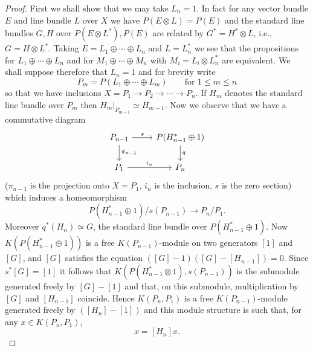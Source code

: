 \documentclass[leqno]{book}
\numberwithin{equation}{section}
\theoremstyle{definition}
\begin{document}
            \begin{proof}
              First we shall show that we may take $L_{n}=1$. In fact for any vector bundle $E$ and line bundle $L$ over $X$ we have $P(E\otimes  L)=P(E)$ and the standard line bundles $G, H$ over $P(E\otimes L^{*}),P(E)$ are related by $G^{*}=H^{*}\otimes L$, i.e., $G=H\otimes L^{*}$. Taking $E=L_1\oplus \cdots\oplus L_{n}$ and $L=L_{n}^{*}$ we see that the propositions for $L_1\oplus \cdots\oplus L_{n}$ and for $M_1\oplus  \cdots\oplus M_{n}$ with $M_{i}=L_{i}\otimes L_{n}^{*}$ are equivalent. We shall suppose therefore that $L_{n}=1$ and for brevity write
              \begin{equation*}
                P_{m}=P(L_1\oplus \cdots\oplus L_{m})\qquad \text{for } 1\le m\le n
              \end{equation*}
              so that we have inclusions $X=P_1\to P_2\to \cdots\to P_{n}$. If $H_{m}$ denotes the standard line bundle over $P_{m}$ then $H_{m}|_{P_{m-1}}\simeq H_{m-1}$. Now we observe that we have a commutative diagram 
              \begin{equation*}
                \begin{tikzcd}
                  P_{n-1}\arrow[r, "s"] \arrow[d, "\pi_{n-1}"] & P(H_{n-1}^{*}\oplus 1)\arrow[d, "q"] \\
                  P_1\arrow[r, "i_{n}"] & P_{n}
                \end{tikzcd}
              \end{equation*}
              ($\pi_{n-1}$ is the projection onto $X=P_1$, $i_{n}$ is the inclusion, $s$ is the zero section) which induces a homeomorphism
              \begin{equation*}
                P(H^{*}_{n-1}\oplus 1)/s(P_{n-1})\to P_{n}/P_1 .
              \end{equation*}
              Moreover $q^{*}(H_{n})\simeq G$, the standard line bundle over $P(H_{n-1}^{*}\oplus 1)$. Now $K(P(H_{n-1}^{*}\oplus 1))$ is a free $K(P_{n-1})$-module on two generators $[1]$ and $[G]$, and $[G]$ satisfies the equation $([G]-1)([G]-[H_{n-1}])=0$. Since $s^{*}[G]=[1]$ it follows that $K(P(H^{*}_{n-1}\otimes 1),s(P_{n-1}))$ is the submodule generated freely by $[G]-[1]$ and that, on this submodule, multiplication by $[G]$ and $[H_{n-1}]$ coincide. Hence $K(P_{n},P_1)$ is a free $K(P_{n-1})$-module generated freely by $([H_{n}]-[1])$ and this module structure is such that, for any $x\in K(P_{n},P_1)$, 
              \begin{equation*}
                [H_{n-1}]x=[H_{n}]x.

\end{equation*}
\end{proof}
\end{document}

